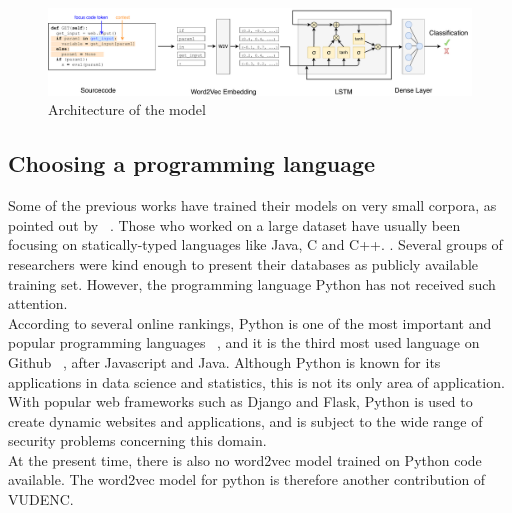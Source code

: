 \documentclass[
a4paper,
pagesize,
pdftex,
12pt,
twoside, %
BCOR=5mm, %
ngerman,
fleqn,
final,
]{scrartcl}
\begin{document}
	\begin{figure}[ht]
		\centering
		\includegraphics[width=\linewidth]{img/Architecture}
		\caption{Architecture of the model}
		\label{fig:architecture}
	\end{figure}
	
	
	\subsection{Choosing a programming language}
	Some of the previous works have trained their models on very small corpora, as pointed out by ~\cite{Bhoopchand.2016}. Those who worked on a large dataset have usually been focusing on statically-typed languages like Java, C and C++. \cite{Bellon.2007,Russell.2018,Liu.2018,Dam.2017, Rolim.2018}. Several groups of researchers were kind enough to present their databases as publicly available training set. However, the programming language Python has not received such attention. \\
	According to several online rankings, Python is one of the most important and popular programming languages ~\cite{AyeshaCuthbert.15.4.2019, VidushiDwivedi.}, and it is the third most used language on Github ~\cite{Github.com.19}, after Javascript and Java. Although Python is known for its applications in data science and statistics, this is not its only area of application. With popular web frameworks such as Django and Flask, Python is used to create dynamic websites and applications, and is subject to the wide range of security problems concerning this domain.\\
	At the present time, there is also no word2vec model trained on Python code available. The word2vec model for python is therefore  another contribution of VUDENC.\\
	
\end{document}
